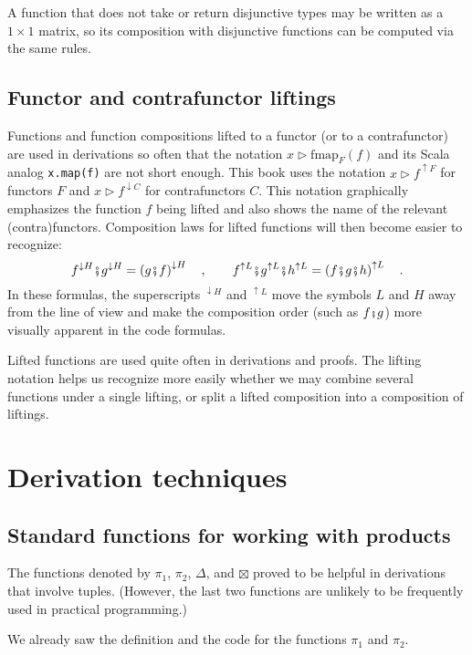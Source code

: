 A function that does not take or return disjunctive types may be written
as a $1\times1$ matrix, so its composition with disjunctive functions
can be computed via the same rules. 

\subsection{Functor and contrafunctor liftings}

Functions and function compositions lifted to a functor (or to a contrafunctor)
are used in derivations so often that the notation $x\triangleright\text{fmap}_{F}(f)$
and its Scala analog \lstinline!x.map(f)! are not short enough. This
book uses the notation $x\triangleright f^{\uparrow F}$ for functors
$F$ and $x\triangleright f^{\downarrow C}$ for contrafunctors $C$.
This notation graphically emphasizes the function $f$ being lifted
and also shows the name of the relevant (contra)functors. Composition
laws for lifted functions will then become easier to recognize:
\[
f^{\downarrow H}\bef g^{\downarrow H}=\left(g\bef f\right)^{\downarrow H}\quad,\quad\quad f^{\uparrow L}\bef g^{\uparrow L}\bef h^{\uparrow L}=\left(f\bef g\bef h\right)^{\uparrow L}\quad.
\]
In these formulas, the superscripts $^{\downarrow H}$ and $^{\uparrow L}$
move the symbols $L$ and $H$ away from the line of view and make
the composition order (such as $f\bef g$) more visually apparent
in the code formulas.

Lifted functions are used quite often in derivations and proofs. The
lifting notation helps us recognize more easily whether we may combine
several functions under a single lifting, or split a lifted composition
into a composition of liftings. 

\section{Derivation techniques}

\subsection{Standard functions for working with products}

The functions denoted by $\pi_{1}$, $\pi_{2}$, $\Delta$, and $\boxtimes$
proved to be helpful in derivations that involve tuples. (However,
the last two functions are unlikely to be frequently used in practical
programming.) 

We already saw the definition and the code for the functions $\pi_{1}$
and $\pi_{2}$. 

